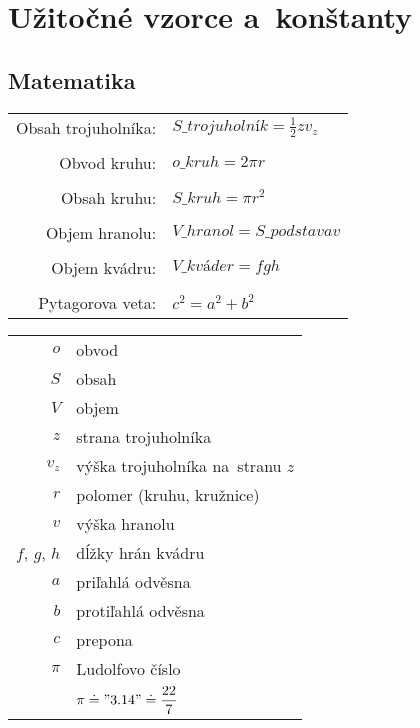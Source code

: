 \documentclass[vyfuk,\classoptions]{fksgeneric}
\begin{document}
\section{Užitočné vzorce a~konštanty}

\subsection{Matematika}

\begin{framed}
\begin{multicols}{2}
\vspace{-1.5cm}
\begin{center}
\begin{tabular}{ r l}
  
Obsah trojuholníka: & $S\_{trojuholník} = \frac{1}{2} z v_z$ \\\\
Obvod kruhu: & $o\_{kruh} = 2 \pi r$ \\\\
Obsah kruhu: & $S\_{kruh} = \pi r^{2}$ \\\\
Objem hranolu: & $V\_{hranol} = S\_{podstava} v$ \\\\
Objem kvádru: & $V\_{kváder} = fgh$\\\\
Pytagorova veta: & $c^{2} = a^{2} + b^{2}$

\end{tabular}
\end{center}

\columnbreak

\begin{center}
\begin{tabular}{ r l }
  
$o$ & obvod \\
$S$ & obsah \\
$V$ & objem \\
$z$ & strana trojuholníka \\
$v_z$ & výška trojuholníka na~stranu $z$\\
$r$ & polomer (kruhu, kružnice) \\
$v$ & výška hranolu \\
$f$, $g$, $h$ & dĺžky hrán kvádru\\	
$a$ & priľahlá odvěsna \\
$b$ & protiľahlá odvěsna \\
$c$ & prepona\\
$\pi$ & Ludolfovo číslo\\
& $\pi \doteq "3.14" \doteq \dfrac{22}{7}$

\end{tabular}
\end{center}
\end{multicols}

\end{framed}
\end{document}
